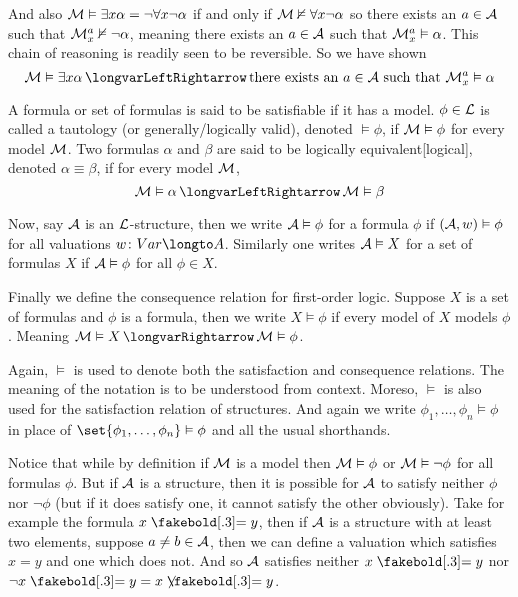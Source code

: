 And also ${\cal M}\vDash\exists x\alpha=\neg\forall x\neg\alpha$ if and only if ${\cal M}\nvDash\forall x\neg\alpha$ so there exists an $a\in{\cal A}$ such that ${\cal M}^a_x\nvDash\neg\alpha$,
meaning there exists an $a\in{\cal A}$ such that ${\cal M}^a_x\vDash\alpha$.
This chain of reasoning is readily seen to be reversible.
So we have shown
$$ {\cal M}\vDash\exists x\alpha \iff \hbox{there exists an $a\in{\cal A}$ such that }{\cal M}^a_x\vDash\alpha $$

\bdefn

    A formula or set of formulas is said to be {\emphcolor satisfiable} if it has a model.
    $\phi\in{\cal L}$ is called a {\emphcolor tautology} (or {\emphcolor generally/logically valid}), denoted $\vDash\phi$, if ${\cal M}\vDash\phi$ for every model ${\cal M}$.
    Two formulas $\alpha$ and $\beta$ are said to be {\emphcolor logically equivalent}[logical], denoted $\alpha\equiv\beta$, if for every model ${\cal M}$,
    $$ {\cal M}\vDash\alpha \iff {\cal M}\vDash\beta $$

    Now, say ${\cal A}$ is an ${\cal L}$-structure, then we write ${\cal A}\vDash\phi$ for a formula $\phi$ if $({\cal A},w)\vDash\phi$ for all valuations $w\colon\Var\longto A$.
    Similarly one writes ${\cal A}\vDash X$ for a set of formulas $X$ if ${\cal A}\vDash\phi$ for all $\phi\in X$.

\edefn

\bdefn

    Finally we define the {\emphcolor consequence relation} for first-order logic.
    Suppose $X$ is a set of formulas and $\phi$ is a formula, then we write $X\vDash\phi$ if every model of $X$ models $\phi$.
    Meaning ${\cal M}\vDash X\implies{\cal M}\vDash\phi$.

\edefn

Again, $\vDash$ is used to denote both the satisfaction and consequence relations.
The meaning of the notation is to be understood from context.
Moreso, $\vDash$ is also used for the satisfaction relation of structures.
And again we write $\phi_1,\dots,\phi_n\vDash\phi$ in place of $\set{\phi_1,\dots,\phi_n}\vDash\phi$ and all the usual shorthands.

Notice that while by definition if ${\cal M}$ is a model then ${\cal M}\vDash\phi$ or ${\cal M}\vDash\neg\phi$ for all formulas $\phi$.
But if ${\cal A}$ is a structure, then it is possible for ${\cal A}$ to satisfy neither $\phi$ nor $\neg\phi$ (but if it does satisfy one, it cannot satisfy the other obviously).
Take for example the formula $x\eq y$, then if ${\cal A}$ is a structure with at least two elements, suppose $a\neq b\in{\cal A}$, then we can define a valuation which satisfies $x=y$ and one which does not.
And so ${\cal A}$ satisfies neither $x\eq y$ nor $\neg x\eq y=x\neqb y$.

